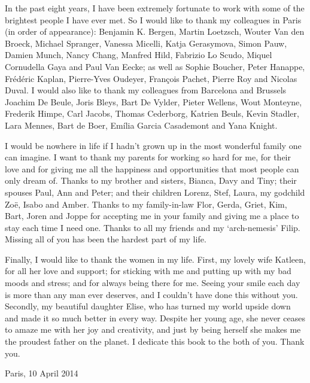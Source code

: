 In the past eight years, I have been extremely fortunate to work with some of the brightest people I have ever met. So I would like to thank my colleagues in Paris (in order of appearance): Benjamin K. Bergen, Martin Loetzsch, Wouter Van den Broeck, Michael Spranger, Vanessa Micelli, Katja Gerasymova, Simon Pauw, Damien Munch, Nancy Chang, Manfred Hild, Fabrizio Lo Scudo, Miquel Cornudella Gaya and Paul Van Eecke; as well as Sophie Boucher, Peter Hanappe, Fr\'{e}d\'{e}ric Kaplan, Pierre-Yves Oudeyer, Fran\c{c}ois Pachet, Pierre Roy and Nicolas Duval. I would also like to thank my colleagues from Barcelona and Brussels Joachim De Beule, Joris Bleys, Bart De Vylder, Pieter Wellens, Wout Monteyne, Frederik Himpe, Carl Jacobs, Thomas Cederborg, Katrien Beuls, Kevin Stadler, Lara Mennes, Bart de Boer, Em\'{i}lia Garcia Casademont and Yana Knight.

I would be nowhere in life if I hadn't grown up in the most wonderful family one can imagine. I want to thank my parents for working so hard for me, for their love and for giving me all the happiness and opportunities that most people can only dream of. Thanks to my brother and sisters, Bianca, Davy and Tiny; their spouses Paul, Ann and Peter; and their children Lorenz, Stef, Laura, my godchild Zo\"e, Isabo and Amber. Thanks to my family-in-law Flor, Gerda, Griet, Kim, Bart, Joren and Joppe for accepting me in your family and giving me a place to stay each time I need one. Thanks to all my friends and my `arch-nemesis' Filip. Missing all of you has been the hardest part of my life.

\vspace{1cm}
\noindent Finally, I would like to thank the women in my life. First, my lovely wife Katleen, for all her love and support; for sticking with me and putting up with my bad moods and stress; and for always being there for me. Seeing your smile each day is more than any man ever deserves, and I couldn't have done this without you. 
Secondly, my beautiful daughter Elise, who has turned my world upside down and made it so much better in every way. Despite her young age, she never ceases to amaze me with her joy and creativity, and just by being herself she makes me the proudest father on the planet. I dedicate this book to the both of you. Thank you.

\begin{flushright}
Paris, 10 April 2014
\end{flushright}






